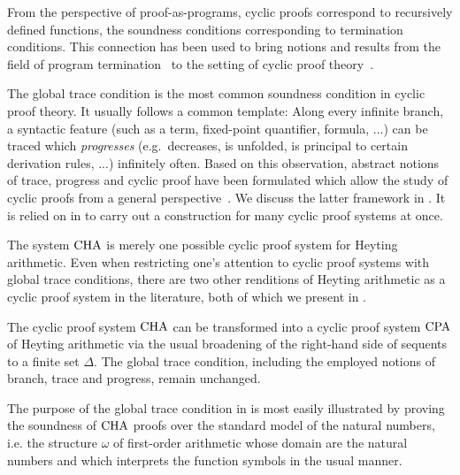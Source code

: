 From the perspective of proof-as-programs, cyclic proofs correspond to
recursively defined functions, the soundness conditions corresponding to
termination conditions. This connection has been used to bring notions and
results from the field of program
termination~\parencite{leeSizechangePrincipleProgram2001} to the setting of
cyclic proof
theory~\parencite{nolletPSPACECompletenessThreadCriterion2019,afshariAbstractCyclicProofs2022}.

The global trace condition is the most common soundness condition in cyclic
proof theory. It usually follows a common template: Along every infinite branch,
a syntactic feature (such as a term, fixed-point quantifier, formula, ...) can
be traced which \emph{progresses} (e.g.~decreases, is unfolded, is principal to
certain derivation rules, ...) infinitely often. Based on this observation,
abstract notions of trace, progress and cyclic proof have been formulated which
allow the study of cyclic proofs from a general
perspective~\parencite{brotherstonSequentCalculusProof2006,afshariAbstractCyclicProofs2022}.
We discuss the latter framework in .
It is relied on in \papOne{} to carry out a construction for
many cyclic proof systems at once.

The system $\mathrm{CHA}$ is merely one possible cyclic proof system for
Heyting arithmetic. Even when restricting one's attention to cyclic proof systems
with global trace conditions, there are two other renditions of Heyting arithmetic
as a cyclic proof system in the literature, both of which we present in
.

The cyclic proof system $\mathrm{CHA}$ can be transformed into a cyclic proof system
$\mathrm{CPA}$ of Heyting arithmetic via the usual broadening of the right-hand side of sequents to a
finite set $\Delta$. The global trace condition, including the employed
notions of branch, trace and progress, remain unchanged.

The purpose of the global trace condition in  is most easily
illustrated by proving the soundness of $\mathrm{CHA}$ proofs over the standard model of
the natural numbers, i.e. the structure $\omega$ of first-order arithmetic whose
domain are the natural numbers and which interprets the function symbols in the
usual manner.

